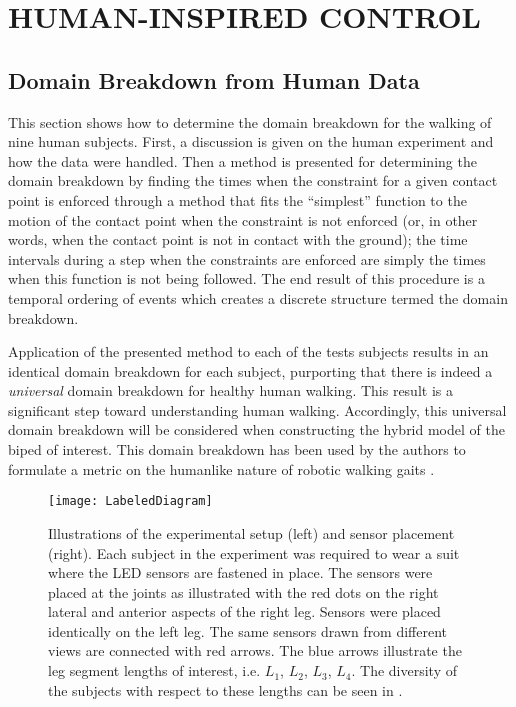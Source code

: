 \chapter{\uppercase{Human-Inspired Control}} \label{ch:hic}

\section{Domain Breakdown from Human Data} \label{sec:domainbreakdown}

This section shows how to determine the domain breakdown for the walking of nine
human subjects.
%
First, a discussion is given on the human experiment and how the data were
handled.
%
Then a method is presented for determining the domain breakdown by finding the
times when the constraint for a given contact point is enforced through a method
that fits the ``simplest'' function to the motion of the contact point when the
constraint is not enforced (or, in other words, when the contact point is not in
contact with the ground);
%
the time intervals during a step when the constraints are enforced are simply
the times when this function is not being followed.
%
The end result of this procedure is a temporal ordering of events which creates
a discrete structure termed the domain breakdown.

Application of the presented method to each of the tests subjects results in an
identical domain breakdown for each subject, purporting that there is indeed a
{\em universal} domain breakdown for healthy human walking.
%
This result is a significant step toward understanding human walking.
%
Accordingly, this universal domain breakdown will be considered when
constructing the hybrid model of the biped of interest.
%
This domain breakdown has been used by the authors to formulate a metric on the
humanlike nature of robotic walking gaits \cite{Ames2011,Vasudevan2013}.

\begin{figure}[t!]
  \centering
  \texttt{[image: LabeledDiagram]}
  \caption[Illustrations of the experimental setup and sensor
  placement.]{Illustrations of the experimental setup (left) and sensor
    placement (right).
    Each subject in the experiment was required to wear a suit where the LED
    sensors are fastened in place.
    The sensors were placed at the joints as illustrated with the red dots on
    the right lateral and anterior aspects of the right leg.
    Sensors were placed identically on the left leg.
    The same sensors drawn from different views are connected with red arrows.
    The blue arrows illustrate the leg segment lengths of interest, i.e. $L_1$,
    $L_2$, $L_3$, $L_4$.
    The diversity of the subjects with respect to these lengths can be seen in
    .}
  \label{fig:Sensors}
\end{figure}

